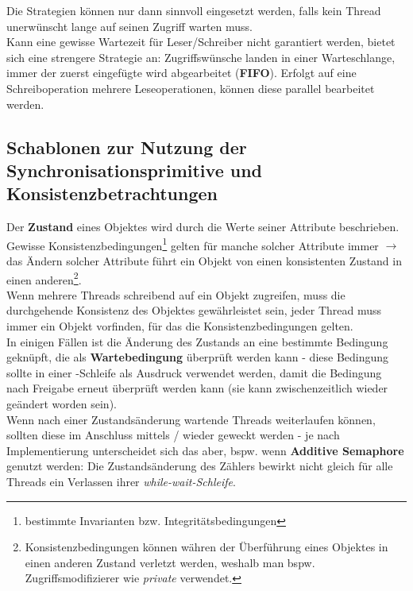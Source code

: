\noindent
Die Strategien können nur dann sinnvoll eingesetzt werden, falls kein Thread unerwünscht lange auf seinen Zugriff warten muss.\\
Kann eine gewisse Wartezeit für Leser/Schreiber nicht garantiert werden, bietet sich eine strengere Strategie an: Zugriffswünsche landen in einer Warteschlange, immer der zuerst eingefügte wird abgearbeitet (\textbf{FIFO}).
Erfolgt auf eine Schreiboperation mehrere Leseoperationen, können diese parallel bearbeitet werden.


\subsection{Schablonen zur Nutzung der Synchronisationsprimitive und Konsistenzbetrachtungen}

Der \textbf{Zustand} eines Objektes wird durch die Werte seiner Attribute beschrieben.\\

\noindent
Gewisse Konsistenzbedingungen\footnote{bestimmte Invarianten bzw. Integritätsbedingungen} gelten für manche solcher Attribute immer $\rightarrow$ das Ändern solcher Attribute führt ein Objekt von einen konsistenten Zustand in einen anderen\footnote{
Konsistenzbedingungen können währen der Überführung eines Objektes in einen anderen Zustand verletzt werden, weshalb man bspw. Zugriffsmodifizierer wie \textit{private} verwendet.
}.\\

\noindent
Wenn mehrere Threads schreibend auf ein Objekt zugreifen, muss die durchgehende Konsistenz des Objektes gewährleistet sein, jeder Thread muss immer ein Objekt vorfinden, für das die Konsistenzbedingungen gelten.\\

\noindent
In einigen Fällen ist die Änderung des Zustands an eine bestimmte Bedingung geknüpft, die als \textbf{Wartebedingung} überprüft werden kann - diese Bedingung sollte in einer -Schleife als Ausdruck verwendet werden, damit die Bedingung nach Freigabe erneut überprüft werden kann (sie kann zwischenzeitlich wieder geändert worden sein).\\

\noindent
Wenn nach einer Zustandsänderung wartende Threads weiterlaufen können, sollten diese im Anschluss mittels / wieder geweckt werden - je nach Implementierung unterscheidet sich das aber, bspw. wenn \textbf{Additive Semaphore} genutzt werden: Die Zustandsänderung des Zählers bewirkt nicht gleich für alle Threads ein Verlassen ihrer \textit{while-wait-Schleife}.\\

